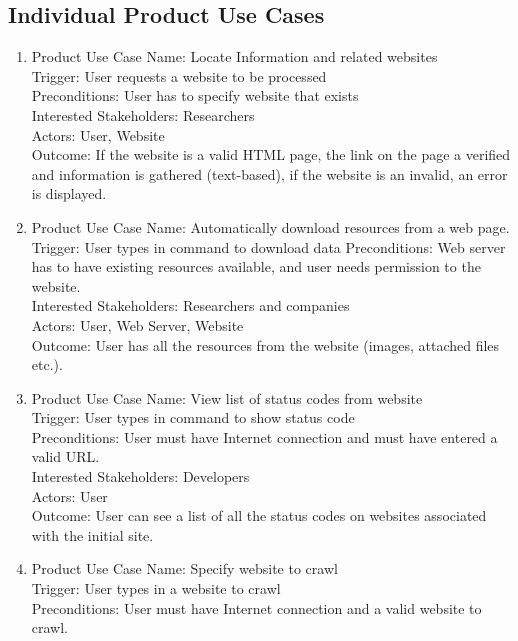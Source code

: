 \documentclass[titlepage]{article}
\begin{document}
\subsection*{Individual Product Use Cases  }
\begin{enumerate}
  \item  Product Use Case Name: Locate Information and related websites \\
  Trigger: User requests a website to be processed \\
Preconditions: User has to specify website that exists\\
Interested Stakeholders: Researchers\\
Actors: User, Website\\
Outcome: If the website is a valid HTML page, the link on the page a verified and information is gathered (text-based), if the website is an invalid, an error is displayed.\\
  \item Product Use Case Name: Automatically download resources from a web page.\\
  Trigger: User types in command to download data
Preconditions: Web server has to have existing resources available, and user needs permission to the website.\\
Interested Stakeholders: Researchers and companies\\
Actors: User, Web Server, Website\\
Outcome: User has all the resources from the website (images, attached files etc.).\\
  \item Product Use Case Name: View list of status codes from website\\
  Trigger: User types in command to show status code\\
Preconditions: User must have Internet connection and must have entered a valid URL.\\
Interested Stakeholders: Developers\\
Actors: User\\
Outcome: User can see a list of all the status codes on websites associated with the initial site.\\
  \item Product Use Case Name: Specify website to crawl\\
Trigger: User types in a website to crawl\\
Preconditions: User must have Internet connection and a valid website to crawl.\\

\end{enumerate}
\end{document}
